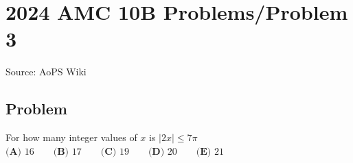 \documentclass[12pt]{article}
\begin{document}
\section*{{2024 AMC 10B Problems/Problem 3}}
Source: AoPS Wiki

\subsection*{Problem}
For how many integer values of $x$ is $|2x| \leq 7 \pi$ $\textbf{(A) } 16 \qquad\textbf{(B) } 17 \qquad\textbf{(C) } 19 \qquad\textbf{(D) } 20 \qquad\textbf{(E) } 21$
\end{document}
